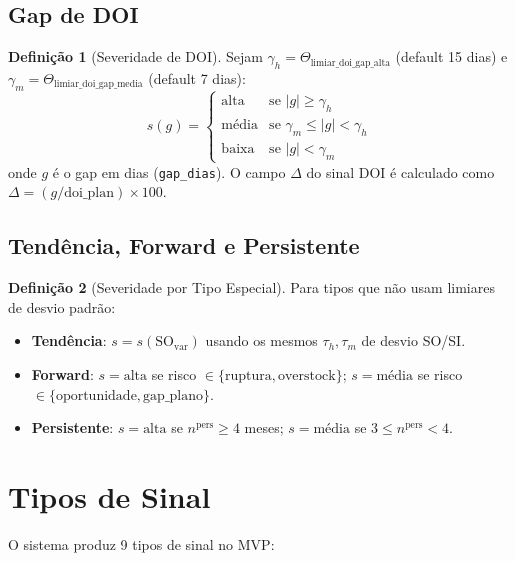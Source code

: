\documentclass[a4paper, 12pt]{report}
\theoremstyle{definition}
\newtheorem{definicao}{Defini\c{c}\~ao}[chapter]
\theoremstyle{remark}
\begin{document}
\subsection{Gap de DOI}

\begin{definicao}[Severidade de DOI]
  Sejam $\gamma_h = \Theta_{\text{limiar\_doi\_gap\_alta}}$ (default 15 dias) e
  $\gamma_m = \Theta_{\text{limiar\_doi\_gap\_media}}$ (default 7 dias):
  \[
    s(g) = \begin{cases}
      \text{alta} & \text{se } |g| \geq \gamma_h \\
      \text{m\'edia} & \text{se } \gamma_m \leq |g| < \gamma_h \\
      \text{baixa} & \text{se } |g| < \gamma_m
    \end{cases}
  \]
  onde $g$ \'e o gap em dias (\texttt{gap\_dias}). O campo $\Delta$ do sinal
  DOI \'e calculado como $\Delta = (g / \text{doi\_plan}) \times 100$.
\end{definicao}

\subsection{Tend\^encia, Forward e Persistente}

\begin{definicao}[Severidade por Tipo Especial]
  Para tipos que n\~ao usam limiares de desvio padr\~ao:
  \begin{itemize}
    \item \textbf{Tend\^encia}: $s = s(\text{SO}_{\text{var}})$ usando
      os mesmos $\tau_h, \tau_m$ de desvio SO/SI.
    \item \textbf{Forward}: $s = \text{alta}$ se risco $\in \{\text{ruptura}, \text{overstock}\}$;
      $s = \text{m\'edia}$ se risco $\in \{\text{oportunidade}, \text{gap\_plano}\}$.
    \item \textbf{Persistente}: $s = \text{alta}$ se $n^{\text{pers}} \geq 4$ meses;
      $s = \text{m\'edia}$ se $3 \leq n^{\text{pers}} < 4$.
  \end{itemize}
\end{definicao}


\section{Tipos de Sinal}

O sistema produz 9 tipos de sinal no MVP:
\end{document}
